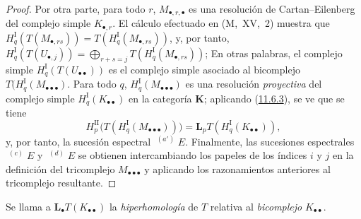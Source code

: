 \begin{proof}
Por otra parte, para todo $r$, $M_{\bullet,r,\bullet}$ es una
resolución de Cartan--Eilenberg del complejo simple $K_{\bullet,r}$.
El cálculo efectuado en (M,~XV,~2) muestra que
$H_q^{\mathrm I}(T(M_{\bullet,rs}))=T(H_q^{\mathrm I}(M_{\bullet,rs}))$,
y, por tanto,
$H_q^{\mathrm I}(T(U_{\bullet,j}))=\bigoplus_{r+s=j}T(H_q^{\mathrm I}(M_{\bullet,rs}))$;
En otras palabras, el complejo simple
$H_q^{\mathrm I}(T(U_{\bullet\bullet}))$ es el complejo simple
asociado al bicomplejo
$T(H_q^{\mathrm I}(M_{\bullet\bullet\bullet})$.
Para todo $q$, $H_q^{\mathrm I}(M_{\bullet\bullet\bullet})$ es una resolución \emph{proyectiva} del complejo simple $H_q^{\mathrm I}(K_{\bullet\bullet})$ en la categoría $\boldsymbol{K}$; aplicando (\hyperref[0.11.6.3-fr]{11.6.3}), se ve que se tiene
\[
H_p^{\mathrm{II}}
\bigl(T(H_q^{\mathrm I}(M_{\bullet\bullet\bullet}))\bigr)
=\mathbf{L}_pT(H_q^{\mathrm I}(K_{\bullet\bullet})),
\]
y, por tanto, la sucesión espectral $\mathop{}^{(a')}E$.
Finalmente, las sucesiones espectrales $\mathop{}^{(c)}E$ y
$\mathop{}^{(d)}E$ se obtienen intercambiando los papeles de los
índices $i$ y $j$ en la definición del tricomplejo
$M_{\bullet\bullet\bullet}$ y aplicando los razonamientos anteriores al
tricomplejo resultante.
\end{proof}

Se llama a $\mathbf{L}_\bullet T(K_{\bullet\bullet})$ la \emph{hiperhomología} de
$T$ relativa al \emph{bicomplejo} $K_{\bullet\bullet}$.

